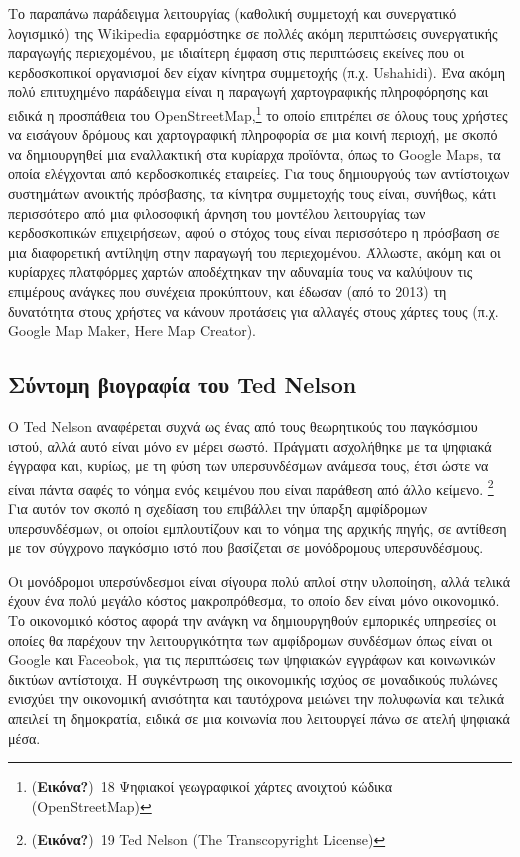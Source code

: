 \documentclass[
]{article}
\begin{document}
Το παραπάνω παράδειγμα λειτουργίας (καθολική συμμετοχή και συνεργατικό
λογισμικό) της Wikipedia εφαρμόστηκε σε πολλές ακόμη περιπτώσεις
συνεργατικής παραγωγής περιεχομένου, με ιδιαίτερη έμφαση στις
περιπτώσεις εκείνες που οι κερδοσκοπικοί οργανισμοί δεν είχαν κίνητρα
συμμετοχής (π.χ. Ushahidi). Ένα ακόμη πολύ επιτυχημένο παράδειγμα είναι
η παραγωγή χαρτογραφικής πληροφόρησης και ειδικά η προσπάθεια του
OpenStreetMap,\footnote{(\textbf{Εικόνα?})~18 Ψηφιακοί γεωγραφικοί
  χάρτες ανοιχτού κώδικα (OpenStreetMap)} το οποίο επιτρέπει σε όλους
τους χρήστες να εισάγουν δρόμους και χαρτογραφική πληροφορία σε μια
κοινή περιοχή, με σκοπό να δημιουργηθεί μια εναλλακτική στα κυρίαρχα
προϊόντα, όπως το Google Maps, τα οποία ελέγχονται από κερδοσκοπικές
εταιρείες. Για τους δημιουργούς των αντίστοιχων συστημάτων ανοικτής
πρόσβασης, τα κίνητρα συμμετοχής τους είναι, συνήθως, κάτι περισσότερο
από μια φιλοσοφική άρνηση του μοντέλου λειτουργίας των κερδοσκοπικών
επιχειρήσεων, αφού ο στόχος τους είναι περισσότερο η πρόσβαση σε μια
διαφορετική αντίληψη στην παραγωγή του περιεχομένου. Άλλωστε, ακόμη και
οι κυρίαρχες πλατφόρμες χαρτών αποδέχτηκαν την αδυναμία τους να καλύψουν
τις επιμέρους ανάγκες που συνέχεια προκύπτουν, και έδωσαν (από το 2013)
τη δυνατότητα στους χρήστες να κάνουν προτάσεις για αλλαγές στους χάρτες
τους (π.χ. Google Map Maker, Here Map Creator).

\hypertarget{ux3c3ux3cdux3bdux3c4ux3bfux3bcux3b7-ux3b2ux3b9ux3bfux3b3ux3c1ux3b1ux3c6ux3afux3b1-ux3c4ux3bfux3c5-ted-nelson}{%
\subsection{Σύντομη βιογραφία του Ted
Nelson}\label{ux3c3ux3cdux3bdux3c4ux3bfux3bcux3b7-ux3b2ux3b9ux3bfux3b3ux3c1ux3b1ux3c6ux3afux3b1-ux3c4ux3bfux3c5-ted-nelson}}

O Ted Nelson αναφέρεται συχνά ως ένας από τους θεωρητικούς του
παγκόσμιου ιστού, αλλά αυτό είναι μόνο εν μέρει σωστό. Πράγματι
ασχολήθηκε με τα ψηφιακά έγγραφα και, κυρίως, με τη φύση των
υπερσυνδέσμων ανάμεσα τους, έτσι ώστε να είναι πάντα σαφές το νόημα ενός
κειμένου που είναι παράθεση από άλλο κείμενο. \footnote{(\textbf{Εικόνα?})~19
  Ted Nelson (The Transcopyright License)} Για αυτόν τον σκοπό η
σχεδίαση του επιβάλλει την ύπαρξη αμφίδρομων υπερσυνδέσμων, οι οποίοι
εμπλουτίζουν και το νόημα της αρχικής πηγής, σε αντίθεση με τον σύγχρονο
παγκόσμιο ιστό που βασίζεται σε μονόδρομους υπερσυνδέσμους.

Οι μονόδρομοι υπερσύνδεσμοι είναι σίγουρα πολύ απλοί στην υλοποίηση,
αλλά τελικά έχουν ένα πολύ μεγάλο κόστος μακροπρόθεσμα, το οποίο δεν
είναι μόνο οικονομικό. Το οικονομικό κόστος αφορά την ανάγκη να
δημιουργηθούν εμπορικές υπηρεσίες οι οποίες θα παρέχουν την
λειτουργικότητα των αμφίδρομων συνδέσμων όπως είναι οι Google και
Faceobok, για τις περιπτώσεις των ψηφιακών εγγράφων και κοινωνικών
δικτύων αντίστοιχα. Η συγκέντρωση της οικονομικής ισχύος σε μοναδικούς
πυλώνες ενισχύει την οικονομική ανισότητα και ταυτόχρονα μειώνει την
πολυφωνία και τελικά απειλεί τη δημοκρατία, ειδικά σε μια κοινωνία που
λειτουργεί πάνω σε ατελή ψηφιακά μέσα.
\end{document}
